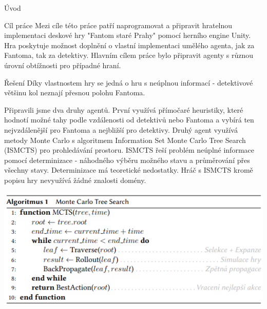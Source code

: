 \documentclass[portrait,a0paper,fontscale=0.25]{baposter}
\begin{document}
\begin{poster}
\begin{posterbox}[column=0,name=background]{Úvod}
\end{posterbox}

\begin{posterbox}[column=0, name=goals, below=background]{Cíl práce}
Mezi cíle této práce patří naprogramovat a připravit hratelnou implementaci deskové hry "Fantom staré Prahy" pomocí herního engine Unity. Hra poskytuje možnost doplnění o vlastní implementaci umělého agenta, jak za Fantoma, tak za detektivy. Hlavním cílem práce bylo připravit agenty s různou úrovní obtížnosti pro případné hraní.

\end{posterbox}

\begin{posterbox}[column=0, name=something1, below=goals]{Řešení}
Díky vlastnostem hry se jedná o hru s neúplnou informací - detektivové většinu kol neznají přesnou polohu Fantoma.

Připravili jsme dva druhy agentů. První využívá přímočaré heuristiky, které hodnotí možné tahy podle vzdálenosti od detektivů nebo Fantoma a vybírá ten nejvzdálenější pro Fantoma a nejbližší pro detektivy. Druhý agent využívá metody Monte Carlo s algoritmem Information Set Monte Carlo Tree Search (ISMCTS) pro prohledávání prostoru. ISMCTS řeší problém neúplné informace pomocí determinizace - náhodného výběru možného stavu a průměrování přes všechny stavy. Determinizace má teoretické nedostatky. Hráč s ISMCTS kromě popisu hry nevyužívá žádné znalosti domény.

\begin{center}
\includegraphics[width=1\linewidth]{img/mcts-alg.png}
\end{center}



\end{posterbox}
\end{poster}
\end{document}
